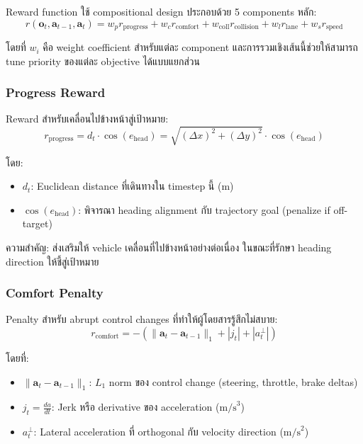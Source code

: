 \documentclass[10pt,a4paper,twocolumn]{article}
\begin{document}
Reward function ใช้ compositional design ประกอบด้วย 5 components หลัก:
\begin{equation}\label{eq:total-reward}
    r(\mathbf{o}_t, \mathbf{a}_{t-1}, \mathbf{a}_t) = w_p r_{\text{progress}} + w_c r_{\text{comfort}} + w_{\text{coll}} r_{\text{collision}} + w_l r_{\text{lane}} + w_s r_{\text{speed}}
\end{equation}

โดยที่ $w_i$ คือ weight coefficient สำหรับแต่ละ component และการรวมเชิงเส้นนี้ช่วยให้สามารถ tune priority ของแต่ละ objective ได้แบบแยกส่วน

\subsubsection{Progress Reward}
Reward สำหรับเคลื่อนไปข้างหน้าสู่เป้าหมาย:
\begin{equation}\label{eq:progress-reward}
    r_{\text{progress}} = d_t \cdot \cos(e_{\text{head}}) = \sqrt{(\Delta x)^2 + (\Delta y)^2} \cdot \cos(e_{\text{head}})
\end{equation}

โดย:
\begin{itemize}
    \item $d_t$: Euclidean distance ที่เดินทางใน timestep นี้ (m)
    \item $\cos(e_{\text{head}})$: พิจารณา heading alignment กับ trajectory goal (penalize if off-target)
\end{itemize}

ความสำคัญ: ส่งเสริมให้ vehicle เคลื่อนที่ไปข้างหน้าอย่างต่อเนื่อง ในขณะที่รักษา heading direction ให้ชี้สู่เป้าหมาย

\subsubsection{Comfort Penalty}
Penalty สำหรับ abrupt control changes ที่ทำให้ผู้โดยสารรู้สึกไม่สบาย:
\begin{equation}\label{eq:comfort-reward}
    r_{\text{comfort}} = - \left( \| \mathbf{a}_t - \mathbf{a}_{t-1} \|_1 + |j_t| + |a^{\perp}_t| \right)
\end{equation}

โดยที่:
\begin{itemize}
    \item $\|\mathbf{a}_t - \mathbf{a}_{t-1}\|_1$: $L_1$ norm ของ control change (steering, throttle, brake deltas)
    \item $j_t = \frac{da}{dt}$: Jerk หรือ derivative ของ acceleration ($\text{m/s}^3$)
    \item $a^{\perp}_t$: Lateral acceleration ที่ orthogonal กับ velocity direction ($\text{m/s}^2$)
\end{itemize}
\end{document}
